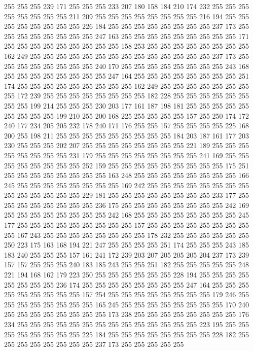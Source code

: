 255 255 255 239 171 255 255 255 233 207 180 158 184 210 174 232 255 255 255 255
255 255 255 255 211 209 255 255 255 255 255 255 255 255 216 194 255 255 255 255
255 255 255 255 226 184 255 255 255 255 255 255 255 255 237 173 255 255 255 255
255 255 255 255 247 163 255 255 255 255 255 255 255 255 255 171 255 255 255 255
255 255 255 255 255 158 253 255 255 255 255 255 255 255 255 162 249 255 255 255
255 255 255 255 255 255 255 255 255 255 255 237 173 255 255 255 255 255 255 255
255 240 170 255 255 255 255 255 255 255 255 243 168 255 255 255 255 255 255 255
255 247 164 255 255 255 255 255 255 255 255 251 174 255 255 255 255 255 255 255
255 255 162 249 255 255 255 255 255 255 255 255 172 239 255 255 255 255 255 255
255 255 182 228 255 255 255 255 255 255 255 255 199 214 255 255 255 230 203 177
161 187 198 181 255 255 255 255 255 255 255 255 255 199 210 255 200 168 225 255
255 255 255 157 255 250 174 172 240 177 234 205 205 232 178 240 171 176 255 255
157 255 255 255 255 225 168 200 255 198 211 255 255 255 255 255 255 255 255 255
184 203 187 161 177 203 230 255 255 255 202 207 255 255 255 255 255 255 255 255
221 189 255 255 255 255 255 255 255 255 231 179 255 255 255 255 255 255 255 255
241 169 255 255 255 255 255 255 255 255 252 159 255 255 255 255 255 255 255 255
255 175 251 255 255 255 255 255 255 255 255 163 248 255 255 255 255 255 255 255
255 166 245 255 255 255 255 255 255 255 255 169 242 255 255 255 255 255 255 255
255 255 255 255 255 255 255 229 181 255 255 255 255 255 255 255 255 233 177 255
255 255 255 255 255 255 255 236 175 255 255 255 255 255 255 255 255 242 169 255
255 255 255 255 255 255 255 242 168 255 255 255 255 255 255 255 255 245 177 255
255 255 255 255 255 255 255 255 157 255 255 255 255 255 255 255 255 255 167 243
255 255 255 255 255 255 255 255 178 232 255 255 255 255 255 255 250 223 175 163
168 194 221 247 255 255 255 255 251 174 255 255 255 243 185 183 240 255 255 255
157 161 241 172 239 203 207 205 205 205 204 237 173 239 157 157 255 255 255 240
183 185 243 255 255 251 182 255 255 255 255 255 248 221 194 168 162 179 223 250
255 255 255 255 255 255 228 194 255 255 255 255 255 255 255 255 236 174 255 255
255 255 255 255 255 255 247 164 255 255 255 255 255 255 255 255 255 157 254 255
255 255 255 255 255 255 255 179 246 255 255 255 255 255 255 255 255 165 245 255
255 255 255 255 255 255 255 170 240 255 255 255 255 255 255 255 255 173 238 255
255 255 255 255 255 255 255 176 234 255 255 255 255 255 255 255 255 255 255 255
255 255 255 223 195 255 255 255 255 255 255 255 255 225 184 255 255 255 255 255
255 255 255 228 182 255 255 255 255 255 255 255 255 237 173 255 255 255 255 255
